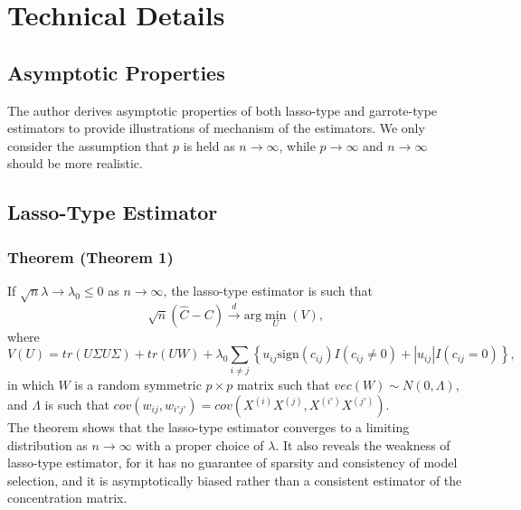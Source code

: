 
\section*{Technical Details}

\subsection*{Asymptotic Properties}
The author derives asymptotic properties of both lasso-type and garrote-type estimators to provide illustrations of mechanism of the estimators. We only consider the assumption that $p$ is held as $n\rightarrow \infty$, while $p\rightarrow \infty$ and $n\rightarrow \infty$ should be more realistic. 

\subsection*{Lasso-Type Estimator}
\subsubsection*{Theorem (Theorem 1)}
If $\sqrt{n} \lambda \rightarrow \lambda_0 \leq 0$ as $n\rightarrow \infty$, the lasso-type estimator is such that 
\[\sqrt{n} \left( \hat{C} - C\right) \stackrel{d}{\rightarrow} \mbox{arg} \min_U \left( V\right) \mbox{,} \] 
where
\[V(U)=tr(U\Sigma U\Sigma )+tr(UW)+\lambda_0 \sum_{i\neq j}\left\lbrace u_{ij} \mbox{sign} (c_{ij})I(c_{ij}\neq 0)+|u_{ij}| I(c_{ij} =0) \right\rbrace \mbox{,}\]
in which $W$ is a random symmetric $p\times p$ matrix such that $vec(W)\sim N(0, \Lambda)$, and $\Lambda$ is such that $cov(w_{ij},w_{i'j'})=cov(X^{(i)}X^{(j)},X^{(i')}X^{(j')})$. \\

The theorem shows that the lasso-type estimator converges to a limiting distribution as $n\rightarrow \infty$ with a proper choice of $\lambda$. It also reveals the weakness of lasso-type estimator, for it has no guarantee of sparsity and consistency of model selection, and it is asymptotically biased rather than a consistent estimator of the concentration matrix.

